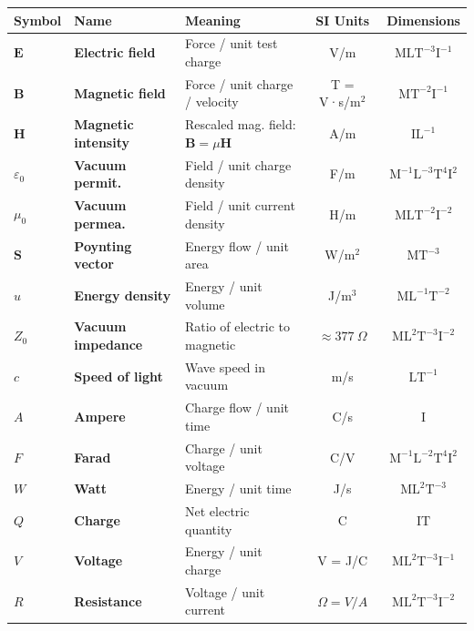 \begin{tcolorbox}[title={Electromagnetic Quantities: Definitions, Units, and Dimensions}, 
colback=gray!6, colframe=black!50, fonttitle=\bfseries, coltitle=black, boxrule=0.4pt, arc=1pt, 
left=6pt, right=6pt, top=4pt, bottom=4pt]

\renewcommand{\arraystretch}{1.3}
\begin{tabularx}{\textwidth}{>{\bfseries}l >{\bfseries}l X c c}
\textbf{Symbol} & \textbf{Name} & \textbf{Meaning} & \textbf{SI Units} & \textbf{Dimensions} \\ \hline

$\mathbf{E}$ & Electric field & Force / unit test charge & V/m & $\mathrm{MLT^{-3}I^{-1}}$ \\
$\mathbf{B}$ & Magnetic field & Force / unit charge / velocity & T = V·s/m$^2$ & $\mathrm{MT^{-2}I^{-1}}$ \\
$\mathbf{H}$ & Magnetic intensity & Rescaled mag. field: $\mathbf{B} = \mu \mathbf{H}$ & A/m & $\mathrm{IL^{-1}}$ \\

$\varepsilon_0$ & Vacuum permit. & Field / unit charge density & F/m & $\mathrm{M^{-1}L^{-3}T^4I^2}$ \\
$\mu_0$ & Vacuum permea. & Field / unit current density & H/m & $\mathrm{MLT^{-2}I^{-2}}$ \\

$\mathbf{S}$ & Poynting vector & Energy flow / unit area & W/m$^2$ & $\mathrm{MT^{-3}}$ \\
$u$ & Energy density & Energy / unit volume & J/m$^3$ & $\mathrm{ML^{-1}T^{-2}}$ \\
$Z_0$ & Vacuum impedance & Ratio of electric to magnetic & $\approx 377\ \Omega$ & $\mathrm{ML^2T^{-3}I^{-2}}$ \\
$c$ & Speed of light & Wave speed in vacuum & m/s & $\mathrm{LT^{-1}}$ \\

$A$ & Ampere & Charge flow / unit time & C/s & $\mathrm{I}$ \\
$F$ & Farad & Charge / unit voltage & C/V & $\mathrm{M^{-1}L^{-2}T^4I^2}$ \\
$W$ & Watt & Energy / unit time & J/s & $\mathrm{ML^2T^{-3}}$ \\

$Q$ & Charge & Net electric quantity & C & $\mathrm{IT}$ \\
$V$ & Voltage & Energy / unit charge & V = J/C & $\mathrm{ML^2T^{-3}I^{-1}}$ \\
$R$ & Resistance & Voltage / unit current & $\Omega = V/A$ & $\mathrm{ML^2T^{-3}I^{-2}}$ \\

\end{tabularx}
\end{tcolorbox}






